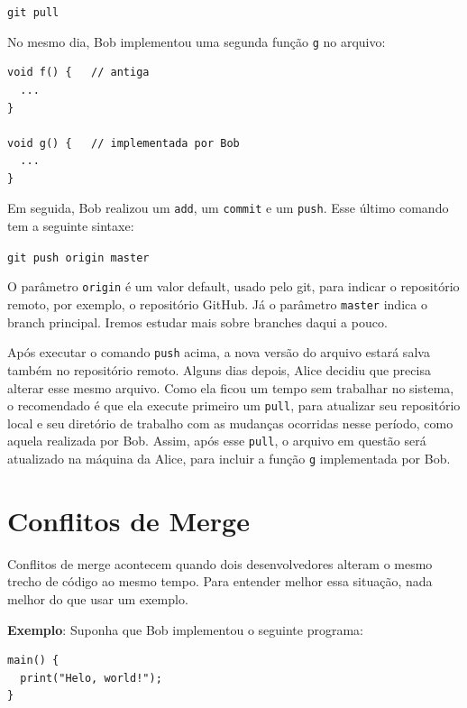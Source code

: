 \documentclass[
  11pt,
  twoside]{book}
\newcommand{\passthrough}[1]{#1}
\begin{document}
\passthrough{\lstinline!git pull!}

No mesmo dia, Bob implementou uma segunda função
\passthrough{\lstinline!g!} no arquivo:

\begin{lstlisting}
void f() {   // antiga
  ... 
}

void g() {   // implementada por Bob
  ... 
}
\end{lstlisting}

Em seguida, Bob realizou um \passthrough{\lstinline!add!}, um
\passthrough{\lstinline!commit!} e um \passthrough{\lstinline!push!}.
Esse último comando tem a seguinte sintaxe:

\passthrough{\lstinline!git push origin master!}

O parâmetro \passthrough{\lstinline!origin!} é um valor default, usado
pelo git, para indicar o repositório remoto, por exemplo, o repositório
GitHub. Já o parâmetro \passthrough{\lstinline!master!} indica o branch
principal. Iremos estudar mais sobre branches daqui a pouco.

Após executar o comando \passthrough{\lstinline!push!} acima, a nova
versão do arquivo estará salva também no repositório remoto. Alguns dias
depois, Alice decidiu que precisa alterar esse mesmo arquivo. Como ela
ficou um tempo sem trabalhar no sistema, o recomendado é que ela execute
primeiro um \passthrough{\lstinline!pull!}, para atualizar seu
repositório local e seu diretório de trabalho com as mudanças ocorridas
nesse período, como aquela realizada por Bob. Assim, após esse
\passthrough{\lstinline!pull!}, o arquivo em questão será atualizado na
máquina da Alice, para incluir a função \passthrough{\lstinline!g!}
implementada por Bob.

\hypertarget{conflitos-de-merge}{%
\section{Conflitos de Merge}\label{conflitos-de-merge}}

 

Conflitos de merge acontecem quando dois desenvolvedores alteram o mesmo
trecho de código ao mesmo tempo. Para entender melhor essa situação,
nada melhor do que usar um exemplo.

\textbf{Exemplo}: Suponha que Bob implementou o seguinte programa:

\begin{lstlisting}
main() {
  print("Helo, world!");
}
\end{lstlisting}
\end{document}
